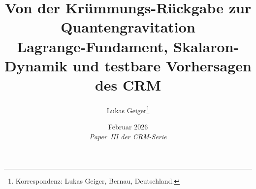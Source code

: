 \documentclass[11pt,a4paper]{article}
\begin{document}
\sloppy


\title{\textbf{\huge Von der Kr\"ummungs-R\"uckgabe zur Quantengravitation}\\[0.5em]
\Large Lagrange-Fundament, Skalaron-Dynamik und testbare Vorhersagen des CRM}

\author[1]{Lukas Geiger\thanks{Korrespondenz: Lukas Geiger, Bernau, Deutschland.}}

\date{Februar 2026 \\ \vspace{0.5em} \small \textit{Paper~III der CRM-Serie \cite{Geiger2026,Geiger2026b}}}

\maketitle
\end{document}
